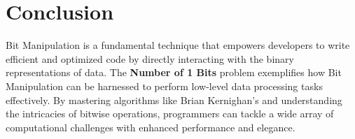 \section*{Conclusion}

Bit Manipulation is a fundamental technique that empowers developers to write efficient and optimized code by directly interacting with the binary representations of data. The \textbf{Number of 1 Bits} problem exemplifies how Bit Manipulation can be harnessed to perform low-level data processing tasks effectively. By mastering algorithms like Brian Kernighan’s and understanding the intricacies of bitwise operations, programmers can tackle a wide array of computational challenges with enhanced performance and elegance.

\printindex

% 
% 
% 
% 
% 
% 
% 
% 